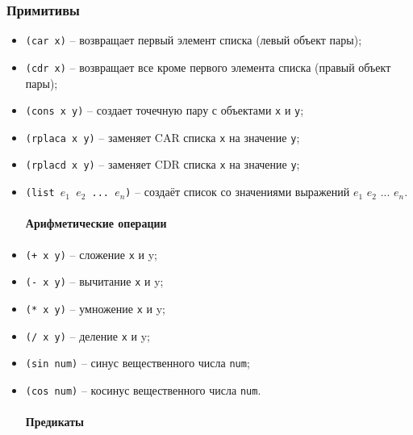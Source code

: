 \subsubsection{Примитивы}

\begin{itemize}

\paragraph{Списки}

\item \texttt{(car x)} -- возвращает первый элемент списка (левый объект пары);
\item \texttt{(cdr x)} -- возвращает все кроме первого элемента списка (правый объект пары);
\item \texttt{(cons x y)} -- создает точечную пару с объектами \texttt{x} и \texttt{y};
\item \texttt{(rplaca x y)} -- заменяет CAR списка \texttt{x} на значение \texttt{y};
\item \texttt{(rplacd x y)} -- заменяет CDR списка \texttt{x} на значение \texttt{y};
\item \texttt{(list $e_1$ $e_2$ ... $e_n$)} -- создаёт список со значениями выражений $e_1$ $e_2$ ... $e_n$.

\paragraph{Арифметические операции}

\item \texttt{(+ x y)} -- сложение \texttt{x} и {y};
\item \texttt{(- x y)} -- вычитание \texttt{x} и {y};
\item \texttt{(* x y)} -- умножение \texttt{x} и {y};
\item \texttt{(/ x y)} -- деление \texttt{x} и {y};
\item \texttt{(sin num)} -- синус вещественного числа \texttt{num};
\item \texttt{(cos num)} -- косинус вещественного числа \texttt{num}.

\paragraph{Предикаты}


\end{itemize}
